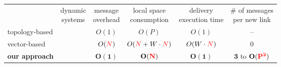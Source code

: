 \setlength{\tabcolsep}{3pt} %
\footnotesize
\begin{tabularx}{1\columnwidth}{@{}Xccccc@{}}
  & \makecell{dynamic\\systems} & \makecell{message\\overhead} & \makecell{local space\\consumption} &  \makecell{delivery\\execution time} & \makecell{\# of messages\\per new link} \\ \cmidrule{2-6}
  topology-based & \NO{\xmark} & $O(1)$ & $O(P)$ & $O(1)$ & -- \\
  vector-based & \YES{\cmark} & $O(\textcolor{red}{N})$ & $O(\textcolor{red}{N}+W\cdot\textcolor{red}{N})$ & $O(W\cdot\textcolor{red}{N})$ & 0 \\ \hline\hline
  \textbf{our approach} & \textbf{\YES{\cmark}} & $\mathbf{O(1)}$ & $\mathbf{O(\textcolor{red}{N})}$ & $\mathbf{O(1)}$ & $\mathbf{3}$ to $\mathbf{O(\textcolor{red}{P^2})}$ \\ 
\end{tabularx}

